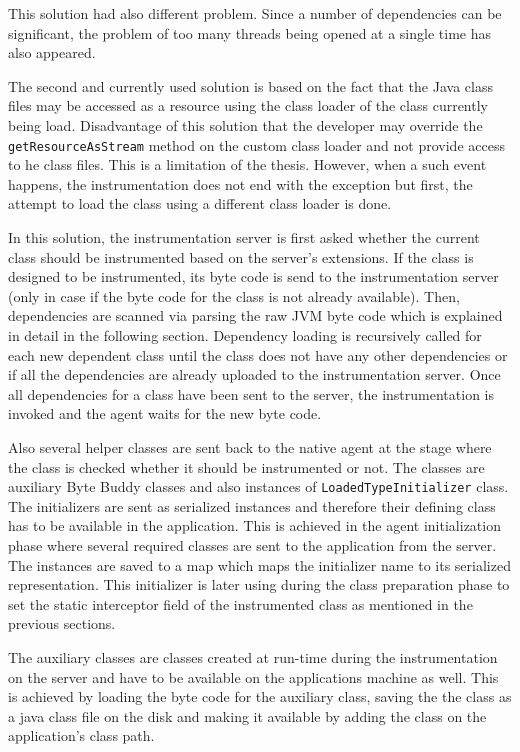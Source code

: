 This solution had also different problem. Since a number of dependencies can be significant, the problem of too many threads being opened at a single time has also appeared. 

The second and currently used solution is based on the fact that the Java class files may be accessed as a resource using the class loader of the class currently being load. Disadvantage of this solution that the developer may override the \texttt{getResourceAsStream} method on the custom class loader and not provide access to he class files. This is a limitation of the thesis. However, when a such event happens, the instrumentation does not end with the exception but first, the attempt to load the class using a different class loader is done. 

In this solution, the instrumentation server is first asked whether the current class should be instrumented based on the server's extensions. If the class is designed to be instrumented, its byte code is send to the instrumentation server (only in case if the byte code for the class is not already available). Then, dependencies are scanned via parsing the raw JVM byte code which is explained in detail in the following section. Dependency loading is recursively called for each new dependent class until the class does not have any other dependencies or if all the dependencies are already uploaded to the instrumentation server. Once all dependencies for a class have been sent to the server, the instrumentation is invoked and the agent waits for the new byte code. 

 Also several helper classes are sent back to the native agent at the stage where the class is checked whether it should be instrumented or not. The classes are auxiliary Byte Buddy classes and also instances of \texttt{LoadedTypeInitializer} class. The initializers are sent as serialized 
instances and therefore their defining class has to be available in the application. This is achieved in the agent initialization phase where several required classes are sent to the application from the server. The instances are saved to a map which maps the initializer name to its serialized representation. This initializer is later using during the class preparation phase to set the static interceptor field of the instrumented class as mentioned in the previous sections.

The auxiliary classes are classes created at run-time during the instrumentation on the server and have to be available on the applications machine as well. This is achieved by loading the byte code for the auxiliary class, saving the the class as a java class file on the disk and making it available by adding the class on the application's class path.

